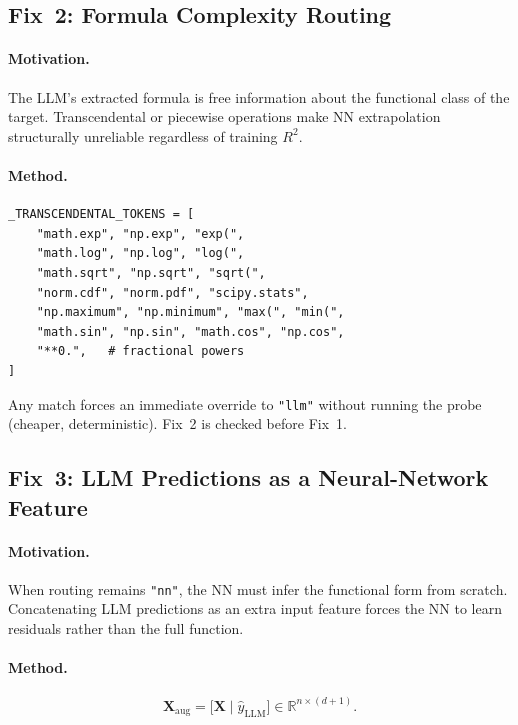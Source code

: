 \documentclass[twoside,11pt]{article}
\begin{document}
\subsection{Fix~2: Formula Complexity Routing}

\paragraph{Motivation.}
The LLM's extracted formula is free information about the functional class of
the target.  Transcendental or piecewise operations make NN extrapolation
structurally unreliable regardless of training $R^2$.

\paragraph{Method.}

\begin{lstlisting}[caption={Transcendental token list.}]
_TRANSCENDENTAL_TOKENS = [
    "math.exp", "np.exp", "exp(",
    "math.log", "np.log", "log(",
    "math.sqrt", "np.sqrt", "sqrt(",
    "norm.cdf", "norm.pdf", "scipy.stats",
    "np.maximum", "np.minimum", "max(", "min(",
    "math.sin", "np.sin", "math.cos", "np.cos",
    "**0.",   # fractional powers
]
\end{lstlisting}

Any match forces an immediate override to \texttt{"llm"} without running the
probe (cheaper, deterministic).  Fix~2 is checked before Fix~1.

\subsection{Fix~3: LLM Predictions as a Neural-Network Feature}

\paragraph{Motivation.}
When routing remains \texttt{"nn"}, the NN must infer the functional form from
scratch.  Concatenating LLM predictions as an extra input feature forces the
NN to learn residuals rather than the full function.

\paragraph{Method.}

\[
  \mathbf{X}_{\text{aug}}
  = \bigl[\mathbf{X} \;\big|\; \hat{y}_{\text{LLM}}\bigr]
  \in \mathbb{R}^{n \times (d+1)}.
\]
\end{document}
